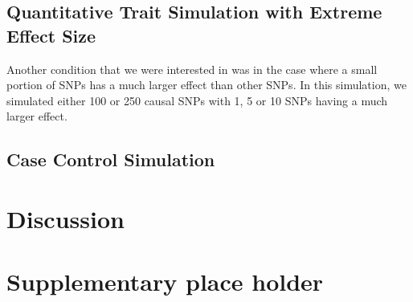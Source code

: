 		\subsection{Quantitative Trait Simulation with Extreme Effect Size}
		
		Another condition that we were interested in was in the case where a small portion of \glspl{SNP} has a much larger effect than other \glspl{SNP}.
		In this simulation, we simulated either 100 or 250 causal \glspl{SNP} with 1, 5 or 10 \glspl{SNP} having a much larger effect.
		
		
		\subsection{Case Control Simulation}
		
		
		
		
		
	\section{Discussion}
	
	\section{Supplementary place holder}
	

